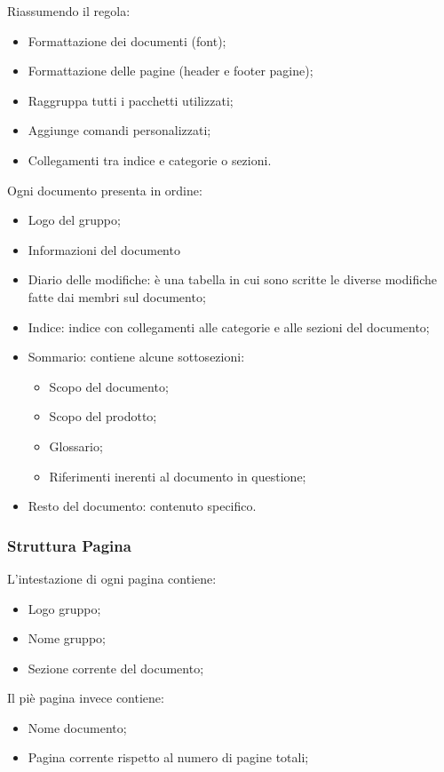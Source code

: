 \documentclass{scalatekids-article}
\begin{document}
Riassumendo il  regola:
\begin{itemize}
\item Formattazione dei documenti (font);
\item Formattazione delle pagine (header e footer pagine);
\item Raggruppa tutti i pacchetti utilizzati;
\item Aggiunge comandi personalizzati;
\item Collegamenti tra indice e categorie o sezioni.
\end{itemize}
Ogni documento presenta in ordine:
\begin{itemize}
\item Logo del gruppo;
\item Informazioni del documento
\item Diario delle modifiche: è una tabella in cui sono scritte le diverse modifiche fatte dai membri sul documento;
\item Indice: indice con collegamenti alle categorie e alle sezioni del documento;
\item Sommario: contiene alcune sottosezioni:
  \begin{itemize}
  \item Scopo del documento;
  \item Scopo del prodotto;
  \item Glossario;
  \item Riferimenti inerenti al documento in questione;
  \end{itemize}
\item Resto del documento: contenuto specifico.
\end{itemize}

\subsubsection{Struttura Pagina}
L'intestazione di ogni pagina contiene:
\begin{itemize}
\item Logo gruppo;
\item Nome gruppo;
\item Sezione corrente del documento;
\end{itemize}
Il piè pagina invece contiene:
\begin{itemize}
\item Nome documento;
\item Pagina corrente rispetto al numero di pagine totali;
\end{itemize}
\end{document}
